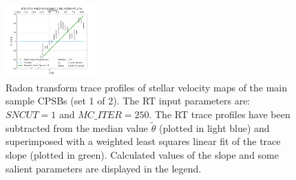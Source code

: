 \begin{figure}
    \includegraphics[width=0.31\textwidth]{Images/WLSFITS/CPSB/8713-3701.png}
%
    \caption{Radon transform trace profiles of stellar velocity maps of the main sample CPSBs (set 1 of 2). The RT input parameters are: $SNCUT=1$ and $MC\_ITER=250$. The RT trace profiles have been subtracted from the median value $\widetilde\theta$ (plotted in light blue) and superimposed with a weighted least squares linear fit of the trace slope (plotted in green). Calculated values of the slope and some salient parameters are displayed in the legend.}
    \label{fig:Radon-traces-CPSB-WLSFITS-1}
\end{figure}

